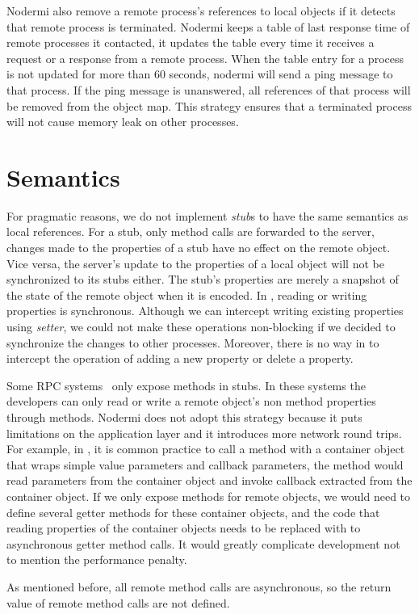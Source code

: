 Nodermi also remove a remote process's references to local objects if
it detects that remote process is terminated.
Nodermi keeps a table of last response time of remote processes it contacted,
it updates the table every time it receives a request or a response from a remote 
process. 
When the table entry for a process is not updated for more than 60 seconds, nodermi
will send a ping message to that process.
If the ping message is unanswered, all references of that process will be removed
from the object map.
This strategy ensures that a terminated process will not cause memory leak on
other processes.

\section{Semantics}

For pragmatic reasons,
we do not implement \emph{stub}s to have the same semantics
as local references.
For a stub, only method calls are forwarded to the server,
changes made to the properties of a stub have no effect on the remote object.
Vice versa, the server's update to the properties of a local object will 
not be synchronized to its stubs either.
The stub's properties are merely a snapshot of the state of 
the remote object when it is encoded.
In \js{}, reading or writing properties is synchronous.
Although we can intercept writing existing properties using
\emph{setter}, we could not make these operations non-blocking if we decided to 
synchronize the changes to other processes.
Moreover, there is no way in \js{} to intercept the operation of adding a new property or delete
a property.

Some RPC systems~\cite{birrell1993distributed} only expose methods in stubs.
In these systems the developers can only read or write a remote object's
non method properties through methods.
Nodermi does not adopt this strategy because it puts limitations on the
application layer and it introduces more network round trips.
For example, in \js{}, it is common practice to call a method with
a container object that wraps simple value parameters and callback parameters,
the method would read parameters from the container object and invoke callback
extracted from the container object.
If we only expose methods for remote objects, we would need to define several 
getter methods for these container objects, 
and the code that reading properties of the container objects
needs to be replaced with to asynchronous getter method calls.
It would greatly complicate development not to mention the performance penalty.


As mentioned before, 
all remote method calls are asynchronous,
so the return value of remote method calls are not defined.






